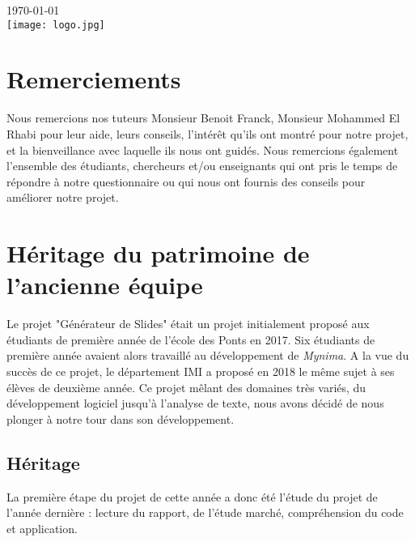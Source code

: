 \documentclass[12pt]{article}
\begin{document}
\begin{titlepage}
{\large \today}\\[2cm] %


\texttt{[image: logo.jpg]}\\[1cm] %
 

\vfill %

\end{titlepage}

\section*{Remerciements}
Nous remercions nos tuteurs Monsieur Benoit Franck, Monsieur Mohammed El Rhabi pour leur aide, leurs conseils, l’intérêt qu’ils ont montré pour notre projet, et la bienveillance avec laquelle ils nous ont guidés. Nous remercions également l'ensemble des étudiants, chercheurs et/ou enseignants qui ont pris le temps de répondre à notre questionnaire ou qui nous ont fournis des conseils pour améliorer notre projet.
\newpage


\tableofcontents

\newpage

\section{Héritage du patrimoine de l'ancienne équipe}

Le projet "Générateur de Slides" était un projet initialement proposé aux étudiants de première année de l'école des Ponts en 2017. Six étudiants de première année avaient alors travaillé au développement de \textit{Mynima}. A la vue du succès de ce projet, le département IMI a proposé en 2018 le même sujet à ses élèves de deuxième année. Ce projet mêlant des domaines très variés, du développement logiciel jusqu'à l'analyse de texte, nous avons décidé de nous plonger à notre tour dans son développement.

\subsection{Héritage}
La première étape du projet de cette année a donc été l'étude du projet de l'année dernière : lecture du rapport, de l'étude marché, compréhension du code et  application. 
\end{document}
